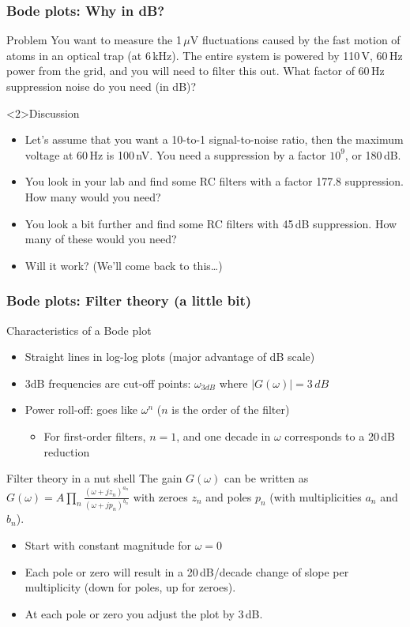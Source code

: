 \documentclass[beamer]{standalone}
\begin{document}
\begin{frame}
 \frametitle{Bode plots: Why in dB?}
 \begin{block}{Problem}
  You want to measure the 1\,$\mu$V fluctuations caused by the fast motion of atoms in an optical trap (at 6\,kHz).  The entire system is powered by 110\,V, 60\,Hz power from the grid, and you will need to filter this out.  What factor of 60\,Hz suppression noise do you need (in dB)?
 \end{block}
 \begin{block}<2>{Discussion}
  \begin{itemize}
   \item Let's assume that you want a 10-to-1 signal-to-noise ratio, then the maximum voltage at 60\,Hz is 100\,nV.  You need a suppression by a factor $10^9$, or 180\,dB.
   \item You look in your lab and find some RC filters with a factor 177.8 suppression.  How many would you need?
   \item You look a bit further and find some RC filters with 45\,dB suppression.  How many of these would you need?
   \item Will it work?  (We'll come back to this\ldots)
  \end{itemize}
 \end{block}
\end{frame}
 
\begin{frame}[t]
 \frametitle{Bode plots: Filter theory (a little bit)}
 \begin{block}{Characteristics of a Bode plot}
  \begin{itemize}
   \item Straight lines in log-log plots (major advantage of dB scale)
   \item 3dB frequencies are cut-off points: $\omega_{3dB}$ where $|G(\omega)| = 3\,dB$
   \item Power roll-off: goes like $\omega^n$ ($n$ is the order of the filter)
   \begin{itemize}
    \item For first-order filters, $n = 1$, and one decade in $\omega$ corresponds to a 20\,dB reduction
   \end{itemize}
  \end{itemize}
 \end{block}
 \begin{block}{Filter theory in a nut shell}
  The gain $G(\omega)$ can be written as $G(\omega) = A \prod_n \frac{(\omega + j z_n)^{a_n}}{(\omega + j p_n)^{b_n}}$ with zeroes $z_n$ and poles $p_n$ (with multiplicities $a_n$ and $b_n$).
  \begin{itemize}
   \item Start with constant magnitude for $\omega = 0$
   \item Each pole or zero will result in a 20\,dB/decade change of slope per multiplicity (down for poles, up for zeroes).
   \item At each pole or zero you adjust the plot by 3\,dB.
  \end{itemize}
 \end{block}
\end{frame}
\end{document}
